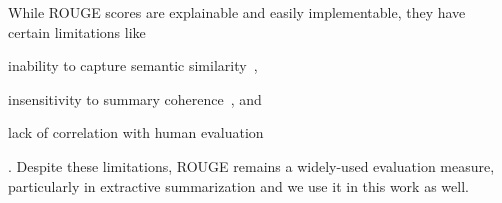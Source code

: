 While ROUGE scores are explainable and easily implementable, they have certain limitations like
\begin{enumerate*}
    \item inability to capture semantic similarity~\cite{akter-etal-2022-revisiting},
    \item insensitivity to summary coherence~\cite{christensen-etal-2013-towards}, and
    \item lack of correlation with human evaluation~\cite{liu2010exploring}
\end{enumerate*}.
Despite these limitations, ROUGE remains a widely-used evaluation measure, particularly in extractive summarization and we use it in this work as well.
